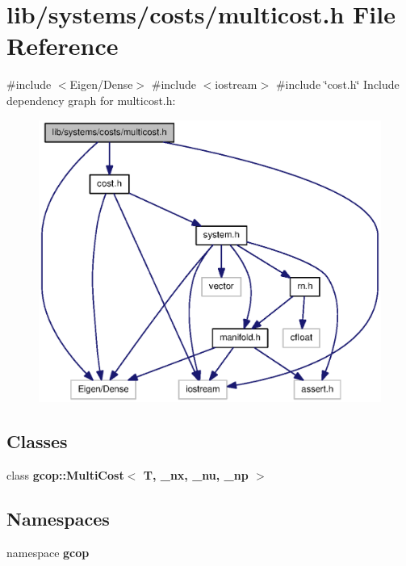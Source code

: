 \section{lib/systems/costs/multicost.h \-File \-Reference}
\label{multicost_8h}
{\ttfamily \#include $<$\-Eigen/\-Dense$>$}\*
{\ttfamily \#include $<$iostream$>$}\*
{\ttfamily \#include \char`\"{}cost.\-h\char`\"{}}\*
\-Include dependency graph for multicost.\-h\-:
\nopagebreak
\begin{figure}[H]
\begin{center}
\leavevmode
\includegraphics[width=350pt]{multicost_8h__incl}
\end{center}
\end{figure}
\subsection*{\-Classes}
\begin{DoxyCompactItemize}
\item 
class {\bf gcop\-::\-Multi\-Cost$<$ T, \-\_\-nx, \-\_\-nu, \-\_\-np $>$}
\end{DoxyCompactItemize}
\subsection*{\-Namespaces}
\begin{DoxyCompactItemize}
\item 
namespace {\bf gcop}
\end{DoxyCompactItemize}
